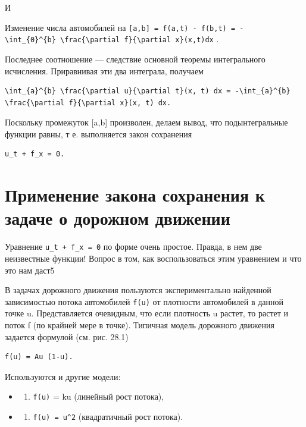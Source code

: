 \documentclass[
  ukrainian,
]{article}
\providecommand{\tightlist}{%
  \setlength{\itemsep}{0pt}\setlength{\parskip}{0pt}}
\begin{document}
И

Изменение числа автомобилей на
\texttt{{[}a,b{]}\ =\ f(a,t)\ -\ f(b,t)\ =\ -\textbackslash{}int\_\{0\}\^{}\{b\}\ \textbackslash{}frac\{\textbackslash{}partial\ f\}\{\textbackslash{}partial\ x\}(x,t)dx}
.

Последнее соотношение --- следствие основной теоремы интегрального
исчисления. Приравнивая эти два интеграла, получаем

\begin{verbatim}
\int_{a}^{b} \frac{\partial u}{\partial t}(x, t) dx = -\int_{a}^{b} \frac{\partial f}{\partial x}(x, t) dx.
\end{verbatim}

Поскольку промежуток {[}a,b{]} произволен, делаем вывод, что
подынтегральные функции равны, т е. выполняется закон сохранения

\begin{verbatim}
u_t + f_x = 0.
\end{verbatim}

\section{Применение закона сохранения к задаче о дорожном
движении}\label{ux43fux440ux438ux43cux435ux43dux435ux43dux438ux435-ux437ux430ux43aux43eux43dux430-ux441ux43eux445ux440ux430ux43dux435ux43dux438ux44f-ux43a-ux437ux430ux434ux430ux447ux435-ux43e-ux434ux43eux440ux43eux436ux43dux43eux43c-ux434ux432ux438ux436ux435ux43dux438ux438}

Уравнение \texttt{u\_t\ +\ f\_x\ =\ 0} по форме очень простое. Правда, в
нем две неизвестные функции! Вопрос в том, как воспользоваться этим
уравнением и что это нам даст5

В задачах дорожного движения пользуются экспериментально найденной
зависимостью потока автомобилей \texttt{f(u)} от плотности автомобилей в
данной точке u. Представляется очевидным, что если плотность u растет,
то растет и поток f (по крайней мере в точке). Типичная модель дорожного
движения задается формулой (см. рис. 28.1)

\begin{verbatim}
f(u) = Au (1-u).
\end{verbatim}

Используются и другие модели:

\begin{itemize}
\tightlist
\item
  \begin{enumerate}
  \def\labelenumi{\arabic{enumi})}
  \tightlist
  \item
    \texttt{f(u)} = ku (линейный рост потока),
  \end{enumerate}
\item
  \begin{enumerate}
  \def\labelenumi{\arabic{enumi})}
  \setcounter{enumi}{1}
  \tightlist
  \item
    \texttt{f(u)\ =\ u\^{}2} (квадратичный рост потока).
  \end{enumerate}
\end{itemize}
\end{document}

